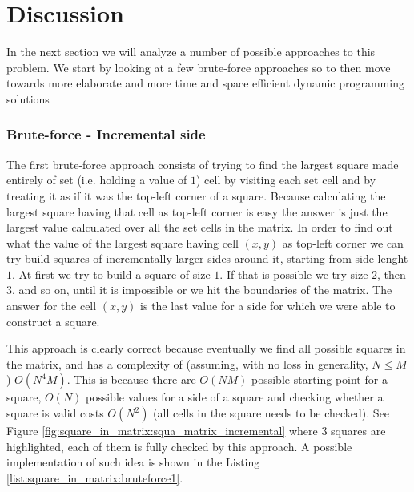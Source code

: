\section{Discussion}
\label{square_in_matrix:sec:discussion}
In the next section we will analyze a number of possible approaches to this problem. We start by
looking at a few brute-force approaches so to then move towards more elaborate and more time and
space efficient dynamic programming solutions

\subsubsection{Brute-force - Incremental side}
\label{square_in_matrix:sec:incremental_side}
The first brute-force approach consists of trying to find the largest square made entirely of set
(i.e. holding a value of $1$) cell by visiting each set cell and by treating it as if it was the
top-left corner of a square. Because calculating the largest square having that cell as top-left
corner is easy the answer is just the largest value calculated over all the set cells in the matrix.
In order to find out what the value of the largest square having cell $(x,y)$ as top-left corner we
can try build squares of incrementally larger sides around it, starting from side lenght $1$. At
first we try to build a square of size $1$. If that is possible we try size $2$, then $3$, and so
on, until it is impossible or we hit the boundaries of the matrix. The answer for the cell $(x,y)$
is the last value for a side for which we were able to construct a square.

This approach is clearly correct because eventually we find all possible squares in the matrix, and
has a complexity of (assuming, with no loss in generality, $N \leq M$) $O(N^4M)$. This is because
there are $O(NM)$ possible starting point for a square, $O(N)$ possible values for a side of a
square and checking whether a square is valid costs $O(N^2)$ (all cells in the square needs to be
checked). See Figure \ref{fig:square_in_matrix:squa_matrix_incremental} where 3 squares are
highlighted, each of them is fully checked by this approach. A possible implementation of such idea
is shown in the Listing \ref{list:square_in_matrix:bruteforce1}.




